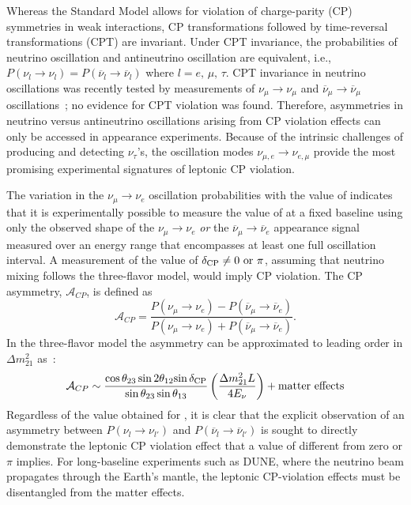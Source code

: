 Whereas the Standard Model allows for violation of charge-parity (CP) symmetries in weak interactions, 
CP transformations followed by time-reversal transformations (CPT) are invariant. 
Under CPT invariance, the probabilities of neutrino oscillation and antineutrino oscillation
are equivalent, i.e., $P(\nu_l \rightarrow \nu_l) =
P(\overline{\nu}_l\rightarrow \overline{\nu}_l)$
where $l = e,\, \mu,\, \tau$. CPT invariance in neutrino oscillations was recently
 tested by measurements of $\nu_\mu
\rightarrow \nu_\mu$ and $\overline{\nu}_\mu \rightarrow \overline{\nu}_\mu$
oscillations~\cite{Adamson:2013whj}; no evidence for CPT
violation was found.  Therefore, asymmetries in neutrino versus antineutrino
oscillations arising from CP violation effects can only be accessed in
appearance experiments.  Because of the intrinsic challenges of
producing and detecting $\nu_\tau$'s, the oscillation modes
$\nu_{\mu,e} \rightarrow \nu_{e,\mu}$ provide the most promising
experimental signatures of leptonic CP violation.

The variation in the $\nu_\mu \rightarrow
\nu_e$ oscillation probabilities with the value of \deltacp
indicates that it is experimentally possible to measure the value of
\deltacp at a fixed baseline using only the observed shape of the
$\nu_\mu \rightarrow \nu_e$ {\em or} the 
$\overline{\nu}_\mu \rightarrow \overline{\nu}_e$
appearance signal measured over an energy range that encompasses at
least one full oscillation interval. A measurement of the value of
$\mdeltacp \neq 0 \ {\rm or} \ \pi$, assuming that neutrino mixing follows the three-flavor model, would imply CP violation.  
The CP asymmetry,
$\mathcal{A}_{CP}$, is defined as 
\begin{equation}
\label{eqn:cp-asymm}
 \mathcal{A}_{CP} = \frac{P(\nu_\mu \rightarrow \nu_e) -
  P(\overline{\nu}_\mu \rightarrow \overline{\nu}_e)}{P(\nu_\mu \rightarrow
  \nu_e) + P(\overline{\nu}_\mu \rightarrow \overline{\nu}_e)}.
\end{equation}
In the three-flavor model the asymmetry can be approximated to leading
order in $\Delta m_{21}^2$ as~\cite{Marciano:2006uc}:
\begin{equation}
\mathcal{A}_{CP} \sim \frac{\cos \theta_{23} \sin 2 \theta_{12}
  {\sin \mdeltacp}}{\sin \theta_{23} \sin \theta_{13}}
\left(\frac{\Delta m^2_{21} L}{ 4 E_{\nu}}\right) + {\rm matter
  \ effects}
\label{eqn:cpasym}
\end{equation}
Regardless of the 
value obtained for \deltacp, it is clear that the explicit observation
of an asymmetry between $P(\nu_l \rightarrow \nu_{l'})$ and
$P(\overline{\nu}_l \rightarrow \overline{\nu}_{l'})$ 
is sought to directly demonstrate the
leptonic CP violation effect that a value of \deltacp different 
from zero or $\pi$ implies.
For long-baseline experiments such as DUNE, where the neutrino beam propagates through 
the Earth's mantle, the leptonic CP-violation effects must be disentangled from 
the matter effects.

